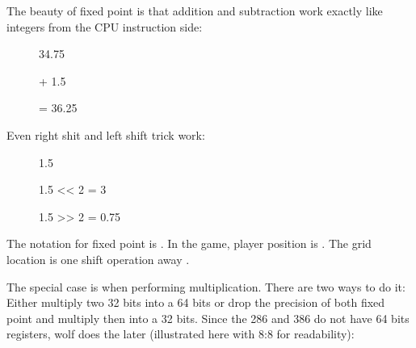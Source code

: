 \bigskip

The beauty of fixed point is that addition and subtraction work exactly like integers from the CPU instruction side:\\




\par
\begin{figure}[H]
 \centering
   

   \caption{34.75} 
\end{figure} 

\begin{figure}[H]
 \centering
   
  \caption{+ 1.5} 
\end{figure} 

\begin{figure}[H]
 \centering
   
  {\caption{= 36.25}}
\end{figure} 
\par
 Even right shit and left shift trick work:\\
 
 \par
\begin{figure}[H]
 \centering
   
   \caption{1.5} 
\end{figure} 

\par
\begin{figure}[H]
 \centering
   
   \caption{1.5 << 2  = 3} 
\end{figure}

\par
\begin{figure}[H]
 \centering
   
   \caption{1.5 >> 2 = 0.75} 
\end{figure}

The notation for fixed point is . In the game, player position is . The grid location is one shift operation away .


 The special case is when performing multiplication. There are two ways to do it: Either multiply two 32 bits into a 64 bits or drop the precision of both fixed point and multiply then into a 32 bits. Since the 286 and 386 do not have 64 bits registers, wolf does the later (illustrated here with 8:8 for readability):


